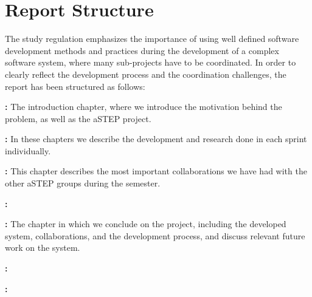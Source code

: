\section{Report Structure} \label{sec:report_structure}
The study regulation emphasizes the importance of using well defined software development methods and practices during the development of a complex software system, where many sub-projects have to be coordinated. In order to clearly reflect the development process and the coordination challenges, the report has been structured as follows:

\textbf{:} The introduction chapter, where we introduce the motivation behind the problem, as well as the aSTEP project.

\textbf{:} In these chapters we describe the development and research done in each sprint individually.

\textbf{:} This chapter describes the most important collaborations we have had with the other aSTEP groups during the semester.

\textbf{:}

\textbf{:} The chapter in which we conclude on the project, including the developed system, collaborations, and the development process, and discuss relevant future work on the system.

\textbf{:}

\textbf{:}